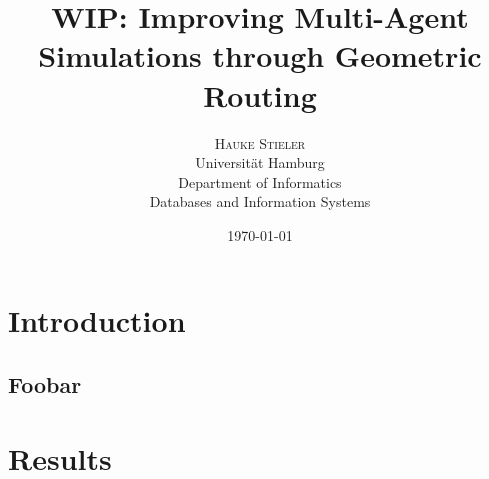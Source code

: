 \documentclass[
	a4paper,
	11pt,
	twoside,
	twocolumn
]{article}
\title{WIP: Improving Multi-Agent Simulations through Geometric Routing}
\author{%
	\textsc{Hauke Stieler} \\[1ex]
	\normalsize Universit\"at Hamburg \\ 
	\normalsize Department of Informatics \\
	\normalsize Databases and Information Systems \\
}
\date{\today}
\begin{document}
	\maketitle
	
	\section{Introduction}
	
	\lipsum[1]
	\subsection{Foobar}
	\lipsum[2-3]
	\section{Results}
	\lipsum[4]
\end{document}
